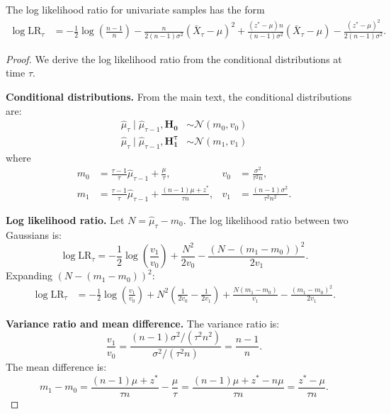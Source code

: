 \documentclass[10pt,a4paper]{amsart}
\newcommand{\cN}{\ensuremath{\mathcal{N}}}
\begin{document}
\begin{theorem}
    \label{thm:log-lr}
    The log likelihood ratio for univariate samples has the form
    \begin{align*}
        \log \mathrm{LR}_\tau & = -\frac{1}{2}\log\left(\frac{n-1}{n}\right) - \frac{n}{2(n-1)\sigma^2}(\bar{X}_\tau - \mu)^2 + \frac{(z^* - \mu) n}{(n-1)\sigma^2}(\bar{X}_\tau - \mu) - \frac{(z^* - \mu)^2}{2(n-1)\sigma^2}.
    \end{align*}
\end{theorem}

\begin{proof}
    We derive the log likelihood ratio from the conditional distributions at time $\tau$.

    \textbf{Conditional distributions.}
    From the main text, the conditional distributions are:
    \begin{align*}
        \hat{\mu}_\tau \mid \hat{\mu}_{\tau-1}, \mathbf{H_0}      & \sim \cN\left(m_0, v_0\right) \\
        \hat{\mu}_\tau \mid \hat{\mu}_{\tau-1}, \mathbf{H_1^\tau} & \sim \cN\left(m_1, v_1\right)
    \end{align*}
    where
    \begin{align*}
        m_0 & = \frac{\tau-1}{\tau} \hat{\mu}_{\tau-1} + \frac{\mu}{\tau},              & v_0 & = \frac{\sigma^2}{\tau^2 n},        \\
        m_1 & = \frac{\tau-1}{\tau} \hat{\mu}_{\tau-1} + \frac{(n-1)\mu + z^*}{\tau n}, & v_1 & = \frac{(n-1)\sigma^2}{\tau^2 n^2}.
    \end{align*}

    \textbf{Log likelihood ratio.}
    Let $N = \hat{\mu}_\tau - m_0$. The log likelihood ratio between two Gaussians is:
    \begin{equation*}
        \log \mathrm{LR}_\tau = -\frac{1}{2}\log\left(\frac{v_1}{v_0}\right) + \frac{N^2}{2v_0} - \frac{(N - (m_1-m_0))^2}{2v_1}.
    \end{equation*}
    Expanding $(N - (m_1-m_0))^2$:
    \begin{align*}
        \log \mathrm{LR}_\tau & = -\frac{1}{2}\log\left(\frac{v_1}{v_0}\right) + N^2\left(\frac{1}{2v_0} - \frac{1}{2v_1}\right) + \frac{N(m_1-m_0)}{v_1} - \frac{(m_1-m_0)^2}{2v_1}.
    \end{align*}

    \textbf{Variance ratio and mean difference.}
    The variance ratio is:
    \begin{equation*}
        \frac{v_1}{v_0} = \frac{(n-1)\sigma^2 / (\tau^2 n^2)}{\sigma^2 / (\tau^2 n)} = \frac{n-1}{n}.
    \end{equation*}
    The mean difference is:
    \begin{equation*}
        m_1 - m_0 = \frac{(n-1)\mu + z^*}{\tau n} - \frac{\mu}{\tau} = \frac{(n-1)\mu + z^* - n\mu}{\tau n} = \frac{z^* - \mu}{\tau n}.
    \end{equation*}


\end{proof}
\end{document}

